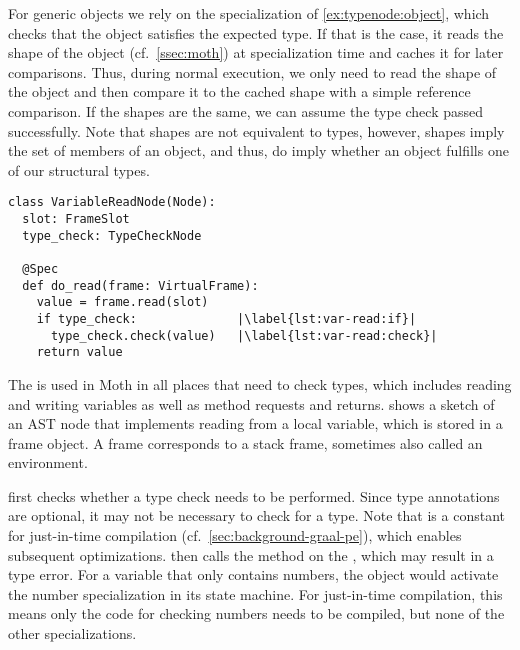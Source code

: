 For generic objects we rely on the specialization of \cref{ex:typenode:object},
which checks that the object satisfies the expected type.
If that is the case, it reads the shape of the object (cf.\ \cref{ssec:moth}) at specialization time
and caches it for later comparisons.
Thus, during normal execution,
we only need to read the shape of the object and then compare it to the cached shape
with a simple reference comparison.
If the shapes are the same, we can assume the type check passed successfully.
Note that shapes are not equivalent to types,
however, shapes imply the set of members of an object, and thus,
do imply whether an object fulfills one of our structural types.

\begin{lstlisting}[label={lst:variable-read},escapechar=|,%
  caption={Sketch of a \code{VariableReadNode} using the \code{TypeCheckNode} to ensure Grace's transient semantics.},%
  float,floatplacement=htb,%
  columns=flexible,morekeywords={global,raise,pass,unknown,not}]
class VariableReadNode(Node):
  slot: FrameSlot
  type_check: TypeCheckNode

  @Spec
  def do_read(frame: VirtualFrame):
    value = frame.read(slot)
    if type_check:              |\label{lst:var-read:if}|
      type_check.check(value)   |\label{lst:var-read:check}|
    return value
\end{lstlisting}

The  is used in Moth in all places that need to check
types, which includes  reading and writing variables as well as method
requests and returns.
 shows a sketch of an AST node that implements reading
from a local variable, which is stored in a frame object.
A frame corresponds to a stack frame,  sometimes also called an environment.

 first checks whether a type check needs to be performed.
Since type annotations are optional, it may not be necessary to check for a type.
Note that  is a constant
for just-in-time compilation (cf.\ \cref{sec:background-graal-pe}),
which enables subsequent optimizations.
 then calls the  method on the
, which may result in a type error.
For a variable that only contains numbers, the  object
would activate the number specialization in its state machine.
For just-in-time compilation, this means only the code for
checking numbers needs to be compiled, but none of the other specializations.

